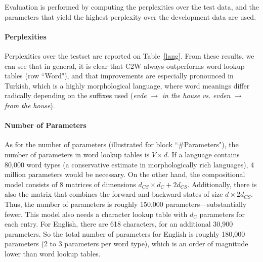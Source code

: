 \documentclass[11pt]{article}
\newcommand{\ignore}[1]{}
\newcommand{\examp}[1]{\emph{#1}}
\begin{document}
\begin{CJK*}{UTF8}{gbsn}
Evaluation is performed by computing the perplexities over the test data, and the parameters that yield the highest perplexity over the development data are used.

\paragraph{Perplexities}
Perplexities over the testset are reported on Table~\ref{lang}. From these results, we can see that in general, it is clear that C2W always outperforms word lookup tables (row ``Word"), and that improvements are especially pronounced in Turkish, which is a highly morphological language, where word meanings differ radically depending on the suffixes used (\examp{evde} $\to$ \examp{in the house} \emph{vs.} \examp{evden} $\to$ \examp{from the house}). \ignore{ For instance, the Turkish word for \examp{ev}~(English \examp{house}), attached with the suffix \examp{-de}, changes its meaning to \examp{in the house}, while adding the suffix \examp{-den} would mean \examp{from the house}. Thus, while the C2W model can learn that the suffix \examp{-de} means inside the stem of the word, word lookup tables would need to have examples for every word with the suffix \examp{-de} to learn good vector representations. Furthermore, as it is not uncommon for multiple suffixes to be added to a word, suffix features would not suffice to learn this morphological process. Improvements on other languages are not as significant, but consistent. For instance, in Portuguese, gender is encoded into nouns as suffixes, for instance, a male cat is spelled as \examp{gato}, a female one as \examp{gata}. Thus, a word lookup table would require all nouns to occur in both forms, while the C2W model can also generalize this process.}

\paragraph{Number of Parameters}
As for the number of parameters (illustrated for block ``\#Parameters"), the number of parameters in word lookup tables is $V\times d$. If a language contains 80,000 word types (a conservative estimate in morphologically rich languages), 4 million parameters would be necessary.  On the other hand, the compositional model consists of 8 matrices of dimensions $d_{CS} \times d_C+2d_{CS}$. Additionally, there is also the matrix that combines the forward and backward states of size $d \times 2d_{CS}$. Thus, the number of parameters is roughly 150,000 parameters---substantially fewer. This model also needs a character lookup table with $d_C$ parameters for each entry. For English, there are 618 characters, for an additional 30,900 parameters. So the total number of parameters for English is roughly 180,000 parameters (2 to 3 parameters per word type), which is an order of magnitude lower than word lookup tables.


\end{CJK*}
\end{document}
